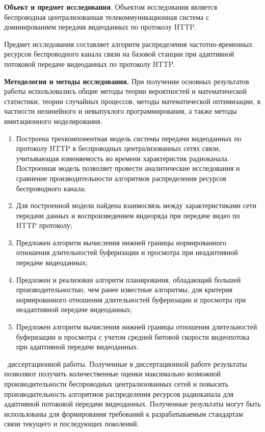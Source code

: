 \textbf{Объект и предмет исследования}. Объектом исследования является беспроводная централизованная телекоммуникационная система с доминированием передачи видеоданных по протоколу HTTP.

Предмет исследования составляет алгоритм распределения частотно-временных ресурсов беспроводного канала связи на базовой станции при адаптивной потоковой передаче видеоданных по протоколу HTTP.

\textbf{Методология и методы исследования.} При получении основных результатов работы использовались общие методы теории вероятностей и математической статистики, теории случайных процессов, методы математической оптимизации, в частности нелинейного и невыпуклого программирования, а также методы имитационного моделирования.

\novelty
\begin{enumerate}
    \item Построена трехкомпонентная модель системы передачи видеоданных по протоколу HTTP в беспроводных централизованных сетях связи, учитывающая изменяемость во времени характеристик радиоканала. Построенная модель позволяет провести аналитические исследования и сравнение производительности алгоритмов распределения ресурсов беспроводного канала;
    \item Для построенной модели найдена взаимосвязь между характеристиками сети передачи данных и воспроизведением видеоряда при передаче видео по HTTP протоколу;
    \item Предложен алгоритм вычисления нижней границы нормированного отношения длительностей буферизации и просмотра при неадаптивной передаче видеоданных;
    \item Предложен и реализован алгоритм планирования, обладающий большей производительностью, чем ранее известные алгоритмы, для критерия нормированного отношения длительностей буферизации и просмотра при неадаптивной передаче видеоданных;
    \item Предложен алгоритм вычисления нижней границы отношения длительностей буферизации и просмотра с учетом средней битовой скорости видеопотока при адаптивной передаче видеоданных.
\end{enumerate}

\influence\ диссертационной работы. Полученные в диссертационной работе результаты позволяют получить количественные оценки максимально возможной производительности беспроводных централизованных сетей и повысить производительность алгоритмов распределения ресурсов радиоканала для адаптивной потоковой передачи видеоданных. Полученные результаты могут быть использованы для формирования требований к разрабатываемым стандартам связи текущего и последующих поколений.

